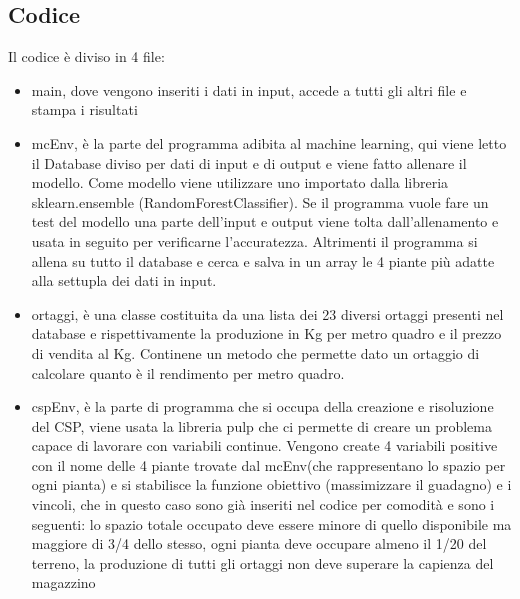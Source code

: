 \documentclass[11pt]{article}
\begin{document}
\subsection{Codice}
Il codice è diviso in 4 file:
\begin{itemize}
\item main, dove vengono inseriti i dati in input, accede a tutti gli altri file e stampa i risultati
\item mcEnv, è la parte del programma adibita al machine learning, qui viene letto il Database diviso per dati di input e di output e viene fatto allenare il modello. Come modello viene utilizzare uno importato dalla libreria sklearn.ensemble (RandomForestClassifier).
Se il programma vuole fare un test del modello una parte dell'input e output viene tolta dall'allenamento e usata in seguito per verificarne l'accuratezza. Altrimenti il programma si allena su tutto il database e cerca e salva in un array le 4 piante più adatte alla settupla dei dati in input.
\item ortaggi, è una classe costituita da una lista dei 23 diversi ortaggi presenti nel database e rispettivamente la produzione in Kg per metro quadro e il prezzo di vendita al Kg. Continene un metodo che permette dato un ortaggio di calcolare quanto è il rendimento per metro quadro.
\item cspEnv, è la parte di programma che si occupa della creazione e risoluzione del CSP, viene usata la libreria pulp che ci permette di creare un problema capace di lavorare con variabili continue. Vengono create 4 variabili positive con il nome delle 4 piante trovate dal mcEnv(che rappresentano lo spazio per ogni pianta) e si stabilisce la funzione obiettivo (massimizzare il guadagno) e i vincoli, che in questo caso sono già inseriti nel codice per comodità e sono i seguenti: lo spazio totale occupato deve essere minore di quello disponibile ma maggiore di 3/4 dello stesso, ogni pianta deve occupare almeno il 1/20 del terreno, la produzione di tutti gli ortaggi non deve superare la capienza del magazzino
\end{itemize}
\end{document}

